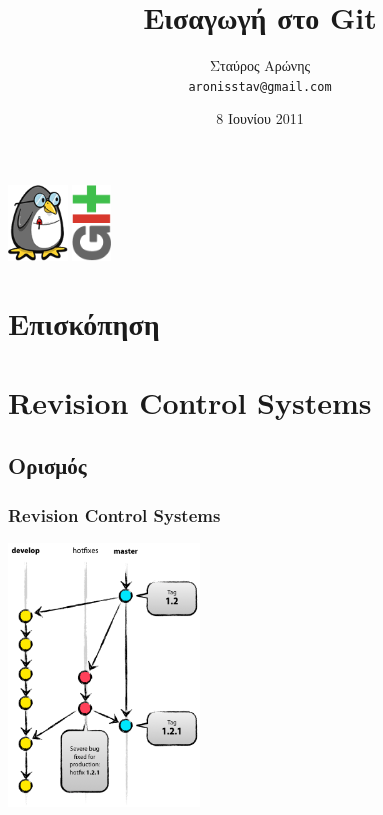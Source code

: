 \documentclass[]{beamer}
\title{Εισαγωγή στο Git}
\author[Σταύρος Αρώνης]{Σταύρος Αρώνης \\ \texttt{aronisstav@gmail.com}}
\date{8 Ιουνίου 2011}
\institute{Κοινότητα Ελεύθερου Λογισμικού ΕΜΠ}
\begin{document}
\begin{frame}
  \titlepage
  \begin{center}
    \includegraphics[height=2cm]{Fosstux.png}
    \hspace{1cm}
    \includegraphics[height=2cm]{git-logo.png}
  \end{center}
\end{frame}

\section*{Επισκόπηση}
\begin{frame}
  \tableofcontents[hidesubsections]
\end{frame}

\section{Revision Control Systems}

\subsection{Ορισμός}

\begin{frame}
  \frametitle{Revision Control Systems}
  \begin{center}
    \includegraphics[height=7cm]{hotfix-branches1.png}
  \end{center}
\end{frame}
\end{document}
